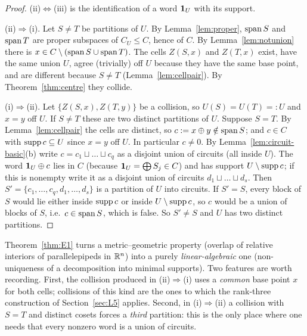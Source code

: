 \begin{proof}
(ii)$\Leftrightarrow$(iii) is the identification of a word $\mathbf 1_U$ with its support.

(ii)$\Rightarrow$(i). Let $S\ne T$ be partitions of $U$. By Lemma~\ref{lem:proper}, $\operatorname{span} S$ and $\operatorname{span} T$ are proper subspaces of $C_U\le C$, hence of $C$. By Lemma~\ref{lem:notunion} there is $x\in C\setminus(\operatorname{span} S\cup\operatorname{span} T)$. The cells $Z(S,x)$ and $Z(T,x)$ exist, have the same union $U$, agree (trivially) off $U$ because they have the same base point, and are different because $S\ne T$ (Lemma~\ref{lem:cellpair}). By Theorem~\ref{thm:centre} they collide.

(i)$\Rightarrow$(ii). Let $\{Z(S,x),Z(T,y)\}$ be a collision, so $U(S)=U(T)=:U$ and $x=y$ off $U$. If $S\ne T$ these are two distinct partitions of $U$. Suppose $S=T$. By Lemma~\ref{lem:cellpair} the cells are distinct, so $c:=x\oplus y\notin\operatorname{span} S$; and $c\in C$ with $\operatorname{supp} c\subseteq U$ since $x=y$ off $U$. In particular $c\ne0$. By Lemma~\ref{lem:circuit-basic}(b) write $c=c_1\sqcup\dots\sqcup c_q$ as a disjoint union of circuits (all inside $U$). The word $\mathbf 1_U\oplus c$ lies in $C$ (because $\mathbf 1_U=\bigoplus S_j\in C$) and has support $U\setminus\operatorname{supp} c$; if this is nonempty write it as a disjoint union of circuits $d_1\sqcup\dots\sqcup d_s$. Then $S'=\{c_1,\dots,c_q,d_1,\dots,d_s\}$ is a partition of $U$ into circuits. If $S'=S$, every block of $S$ would lie either inside $\operatorname{supp} c$ or inside $U\setminus\operatorname{supp} c$, so $c$ would be a union of blocks of $S$, i.e.\ $c\in\operatorname{span} S$, which is false. So $S'\ne S$ and $U$ has two distinct partitions.
\end{proof}


\begin{remark}\label{rem:E1geo}
Theorem~\ref{thm:E1} turns a metric--geometric property (overlap of relative interiors of parallelepipeds in $\mathbb R^n$) into a purely \emph{linear-algebraic} one (non-uniqueness of a decomposition into minimal supports). Two features are worth recording. First, the collision produced in (ii)$\Rightarrow$(i) uses a \emph{common} base point $x$ for both cells; collisions of this kind are the ones to which the rank-three construction of Section~\ref{sec:L5} applies. Second, in (i)$\Rightarrow$(ii) a collision with $S=T$ and distinct cosets forces a \emph{third} partition: this is the only place where one needs that every nonzero word is a union of circuits.
\end{remark}

